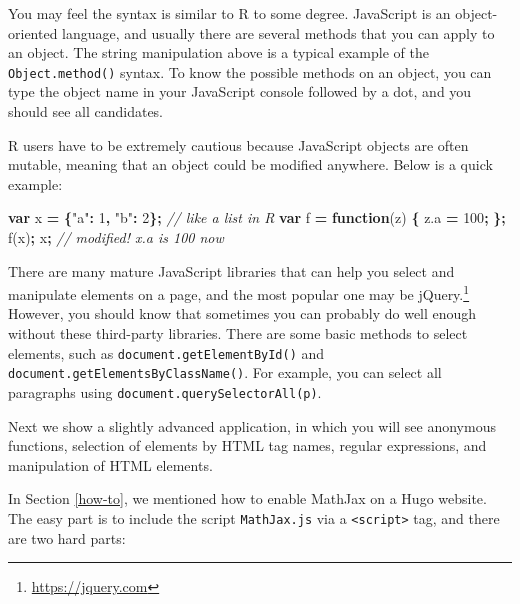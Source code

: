 \documentclass[12pt,]{krantz}
\makeatletter
\newenvironment{Shaded}{\begin{snugshade}}{\end{snugshade}}
\newcommand{\KeywordTok}[1]{\textcolor[rgb]{0.13,0.29,0.53}{\textbf{#1}}}
\newcommand{\DecValTok}[1]{\textcolor[rgb]{0.00,0.00,0.81}{#1}}
\newcommand{\StringTok}[1]{\textcolor[rgb]{0.31,0.60,0.02}{#1}}
\newcommand{\CommentTok}[1]{\textcolor[rgb]{0.56,0.35,0.01}{\textit{#1}}}
\newcommand{\VariableTok}[1]{\textcolor[rgb]{0.00,0.00,0.00}{#1}}
\newcommand{\OperatorTok}[1]{\textcolor[rgb]{0.81,0.36,0.00}{\textbf{#1}}}
\newcommand{\AttributeTok}[1]{\textcolor[rgb]{0.77,0.63,0.00}{#1}}
\newcommand{\NormalTok}[1]{#1}
\renewcommand{\href}[2]{#2\footnote{\url{#1}}}
\newenvironment{kframe}{%
\medskip{}
\setlength{\fboxsep}{.8em}
 \def\at@end@of@kframe{}%
 \ifinner\ifhmode%
  \def\at@end@of@kframe{\end{minipage}}%
  \begin{minipage}{\columnwidth}%
 \fi\fi%
 \def\FrameCommand##1{\hskip\@totalleftmargin \hskip-\fboxsep
 \colorbox{shadecolor}{##1}\hskip-\fboxsep
     \hskip-\linewidth \hskip-\@totalleftmargin \hskip\columnwidth}%
 \MakeFramed {\advance\hsize-\width
   \@totalleftmargin\z@ \linewidth\hsize
   \@setminipage}}%
 {\par\unskip\endMakeFramed%
 \at@end@of@kframe}
\renewenvironment{Shaded}{\begin{kframe}}{\end{kframe}}
\theoremstyle{definition}
\theoremstyle{definition}
\theoremstyle{definition}
\theoremstyle{remark}
\makeatother
\begin{document}
You may feel the syntax is similar to R to some degree. JavaScript is an
object-oriented language, and usually there are several methods that you
can apply to an object. The string manipulation above is a typical
example of the \texttt{Object.method()} syntax. To know the possible
methods on an object, you can type the object name in your JavaScript
console followed by a dot, and you should see all candidates.

R users have to be extremely cautious because JavaScript objects are
often mutable, meaning that an object could be modified anywhere. Below
is a quick example:

\begin{Shaded}
\begin{Highlighting}[]
\KeywordTok{var}\NormalTok{ x }\OperatorTok{=} \OperatorTok{\{}\StringTok{"a"}\OperatorTok{:} \DecValTok{1}\OperatorTok{,} \StringTok{"b"}\OperatorTok{:} \DecValTok{2}\OperatorTok{\};}  \CommentTok{// like a list in R}
\KeywordTok{var}\NormalTok{ f }\OperatorTok{=} \KeywordTok{function}\NormalTok{(z) }\OperatorTok{\{}
  \VariableTok{z}\NormalTok{.}\AttributeTok{a} \OperatorTok{=} \DecValTok{100}\OperatorTok{;}
\OperatorTok{\};}
\AttributeTok{f}\NormalTok{(x)}\OperatorTok{;}
\NormalTok{x}\OperatorTok{;}  \CommentTok{// modified! x.a is 100 now}
\end{Highlighting}
\end{Shaded}

There are many mature JavaScript libraries that can help you select and
manipulate elements on a page, and the most popular one may
be \href{https://jquery.com}{jQuery.} However, you should
know that sometimes you can probably do well enough without these
third-party libraries. There are some basic methods to select elements,
such as \texttt{document.getElementById()} and
\texttt{document.getElementsByClassName()}. For example, you can select
all paragraphs using
\texttt{document.querySelectorAll(\textquotesingle{}p\textquotesingle{})}.

Next we show a slightly advanced application, in which you will see
anonymous functions, selection of elements by HTML tag names, regular
expressions, and manipulation of HTML elements.

In Section \ref{how-to}, we mentioned how to enable
MathJax on a Hugo website. The easy part is to include
the script \texttt{MathJax.js} via a
\texttt{\textless{}script\textgreater{}} tag, and there are two hard
parts:
\end{document}
